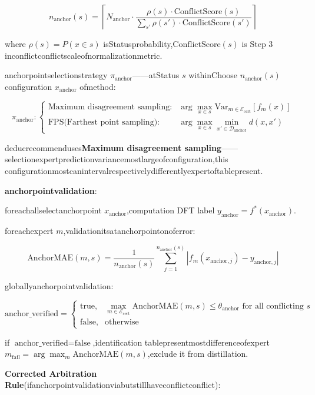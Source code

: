 \documentclass[
  12pt,
]{article}
\begin{document}
\[n_{\text{anchor}}(s) = \left\lceil N_{\text{anchor}} \cdot \frac{\rho(s) \cdot \text{ConflictScore}(s)}{\sum_{s'} \rho(s') \cdot \text{ConflictScore}(s')} \right\rceil\]

where \(\rho(s) = P(x \in s)\) isStatusprobability,\(\text{ConflictScore}(s)\) is
Step 3 inconflictconflictscaleofnormalizationmetric.

anchorpointselectionstrategy \(\pi_{\text{anchor}}\)------atStatus \(s\) withinChoose
\(n_{\text{anchor}}(s)\)  configuration \(x_{\text{anchor}}\) ofmethod:

\[\pi_{\text{anchor}}: \begin{cases}
\text{Maximum disagreement sampling}: & \displaystyle \arg\max_{x \in s} \text{Var}_{m \in \mathcal{E}_{\text{cert}}}[f_m(x)] \\[0.8em]
\text{FPS(Farthest point sampling)}: & \displaystyle \arg\max_{x \in s} \min_{x' \in \mathcal{D}_{\text{anchor}}} d(x, x')
\end{cases}\]

deducrecommenduses\textbf{Maximum disagreement sampling}------selectionexpertpredictionvariancemostlargeofconfiguration,this configurationmostcanintervalrespectivelydifferentlyexpertoftablepresent.

\textbf{anchorpointvalidation}:

foreachallselectanchorpoint \(x_{\text{anchor}}\),computation DFT label 
\(y_{\text{anchor}} = f^*(x_{\text{anchor}})\).

foreachexpert \(m\),validationitsatanchorpointonoferror:

\[\text{AnchorMAE}(m, s) = \frac{1}{n_{\text{anchor}}(s)} \sum_{j=1}^{n_{\text{anchor}}(s)} \left| f_m(x_{\text{anchor},j}) - y_{\text{anchor},j} \right|\]

globallyanchorpointvalidation:

\[\text{anchor\_verified} = \begin{cases}
\text{true}, & \max_{m \in \mathcal{E}_{\text{cert}}} \text{AnchorMAE}(m, s) \le \theta_{\text{anchor}} \text{ for all conflicting } s \\[0.5em]
\text{false}, & \text{otherwise}
\end{cases}\]

if \(\text{anchor\_verified} = \text{false}\),identification tablepresentmostdifferenceofexpert
\(m_{\text{fail}} = \arg\max_m \text{AnchorMAE}(m, s)\),exclude it from distillation.

\textbf{Corrected Arbitration Rule}(ifanchorpointvalidationviabutstillhaveconflictconflict):
\end{document}
